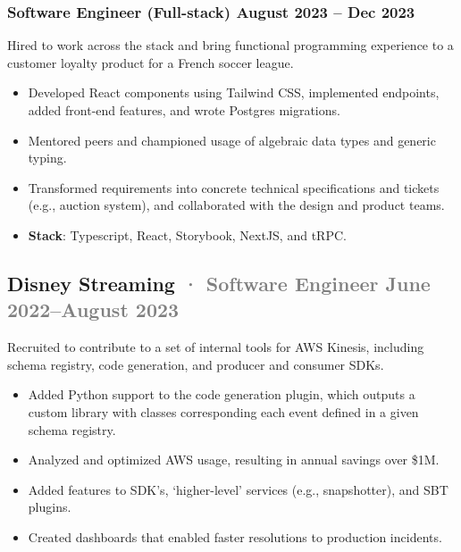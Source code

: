 \documentclass[10pt]{article} %
\providecommand{\tightlist}{%
  \setlength{\itemsep}{0pt}\setlength{\parskip}{0pt}}
\renewcommand{\emph}[1]{%
  \textcolor{gray}{#1}%
}
\begin{document}
\begin{paracol}{2}
\hypertarget{software-engineer-full-stack-august-2023-dec-2023}{%
\subsubsection{\texorpdfstring{\small Software Engineer (Full-stack)
\hfill August 2023 -- Dec
2023}{Software Engineer (Full-stack) August 2023 -- Dec 2023}}\label{software-engineer-full-stack-august-2023-dec-2023}}

Hired to work across the stack and bring functional programming
experience to a customer loyalty product for a French soccer league.

\begin{itemize}
\tightlist
\item
  Developed React components using Tailwind CSS, implemented endpoints,
  added front-end features, and wrote Postgres migrations.
\item
  Mentored peers and championed usage of algebraic data types and
  generic typing.
\item
  Transformed requirements into concrete technical specifications and
  tickets (e.g., auction system), and collaborated with the design and
  product teams.
\item
  \textbf{Stack}: Typescript, React, Storybook, NextJS, and tRPC.
\end{itemize}

\hypertarget{disney-streaming-software-engineer-june-2022august-2023}{%
\subsection{\texorpdfstring{Disney Streaming \emph{· \small Software
Engineer \hfill June 2022--August
2023}}{Disney Streaming · Software Engineer June 2022--August 2023}}\label{disney-streaming-software-engineer-june-2022august-2023}}

Recruited to contribute to a set of internal tools for AWS Kinesis,
including schema registry, code generation, and producer and consumer
SDKs.

\begin{itemize}
\tightlist
\item
  Added Python support to the code generation plugin, which outputs a
  custom library with classes corresponding each event defined in a
  given schema registry.
\item
  Analyzed and optimized AWS usage, resulting in annual savings over
  \$1M.
\item
  Added features to SDK's, `higher-level' services (e.g., snapshotter),
  and SBT plugins.
\item
  Created dashboards that enabled faster resolutions to production
  incidents.
\end{itemize}


\end{paracol}
\end{document}
